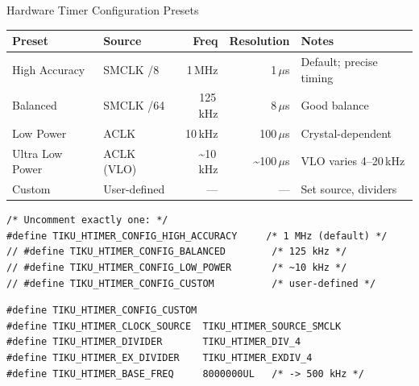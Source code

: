 \documentclass[aspectratio=169, 10pt]{beamer}
\begin{document}
\begin{frame}[fragile]{Hardware Timer Configuration Presets}
\begin{table}
\centering
\small
\begin{tabular}{@{}llrrp{3.5cm}@{}}
\toprule
\textbf{Preset} & \textbf{Source} & \textbf{Freq} & \textbf{Resolution} & \textbf{Notes} \\
\midrule
High Accuracy  & SMCLK /8     & 1\,MHz   & 1\,$\mu$s   & Default; precise timing \\
Balanced       & SMCLK /64    & 125\,kHz & 8\,$\mu$s   & Good balance \\
Low Power      & ACLK         & 10\,kHz  & 100\,$\mu$s & Crystal-dependent \\
Ultra Low Power & ACLK (VLO)  & \textasciitilde10\,kHz & \textasciitilde100\,$\mu$s & VLO varies 4--20\,kHz \\
Custom         & User-defined & ---      & ---          & Set source, dividers \\
\bottomrule
\end{tabular}
\end{table}

\begin{lstlisting}[style=cstyle, title={arch/msp430/tiku\_htimer\_config.h --- selecting a preset}]
/* Uncomment exactly one: */
#define TIKU_HTIMER_CONFIG_HIGH_ACCURACY     /* 1 MHz (default) */
// #define TIKU_HTIMER_CONFIG_BALANCED        /* 125 kHz */
// #define TIKU_HTIMER_CONFIG_LOW_POWER       /* ~10 kHz */
// #define TIKU_HTIMER_CONFIG_CUSTOM          /* user-defined */
\end{lstlisting}

\begin{lstlisting}[style=cstyle, title={Custom configuration example}]
#define TIKU_HTIMER_CONFIG_CUSTOM
#define TIKU_HTIMER_CLOCK_SOURCE  TIKU_HTIMER_SOURCE_SMCLK
#define TIKU_HTIMER_DIVIDER       TIKU_HTIMER_DIV_4
#define TIKU_HTIMER_EX_DIVIDER    TIKU_HTIMER_EXDIV_4
#define TIKU_HTIMER_BASE_FREQ     8000000UL   /* -> 500 kHz */
\end{lstlisting}
\end{frame}
\end{document}
